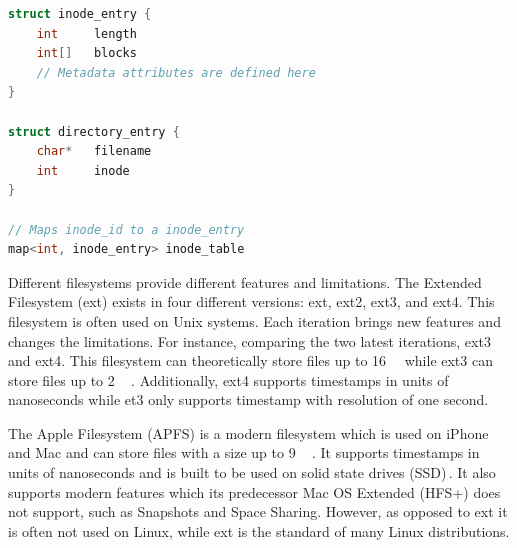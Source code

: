 \begin{minipage}{\linewidth}
\begin{lstlisting}[language=c, caption={Pseudocode of a minimalistic inode filesystem structure}, label=lst:inode_fs]
struct inode_entry {
	int 	length
	int[]	blocks
	// Metadata attributes are defined here
}

struct directory_entry {
	char*   filename
	int     inode
}

// Maps inode_id to a inode_entry
map<int, inode_entry> inode_table

\end{lstlisting}
\end{minipage}

Different filesystems provide different features and limitations. The Extended Filesystem (ext) exists in four different versions: ext, ext2, ext3, and ext4. This filesystem is often used on Unix systems. Each iteration brings new features and changes the limitations. For instance, comparing the two latest iterations, ext3 and ext4. This filesystem can theoretically store files up to \SI{16}{\tebi\byte} while ext3 can store files up to \SI{2}{\tebi\byte}\,\cite{salterUnderstandingLinuxFilesystems2018}. Additionally, ext4 supports timestamps in units of nanoseconds while et3 only supports timestamp with resolution of one second. 

The Apple Filesystem (APFS) is a modern filesystem which is used on iPhone and Mac and can store files with a size up to \SI{9}{\exa\byte}\,\cite{APFSAppleFile2017}. It supports timestamps in units of nanoseconds and is built to be used on solid state drives (SSD)\,\cite{nelsonWhatAPFSDoes}. It also supports modern features which its predecessor Mac OS Extended (HFS+) does not support, such as Snapshots and Space Sharing. However, as opposed to ext it is often not used on Linux, while ext is the standard of many Linux distributions. %





